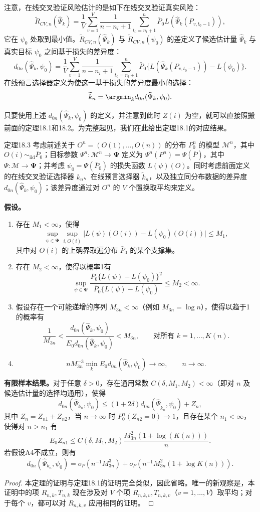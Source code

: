 注意，在线交叉验证风险估计的是如下在线交叉验证真实风险：
\[
 \widetilde R_{CV,n}(\widehat\Psi_k)
 =\frac{1}{V}\sum_{v=1}^{V}\frac{1}{n-n_l+1}
 \sum_{t_0=n_l+1}^{n}\bar P_0L(\widehat\Psi_k(P_{v,t_0-1})),
\]
它在 $\psi_0$ 处取到最小值。$\widetilde R_{CV,n}(\widehat\Psi_k)$ 与 $\widetilde R_{CV,n}(\psi_0)$ 的差定义了候选估计量 $\widehat\Psi_k$ 与真实目标 $\psi_0$ 之间基于损失的差异度：
\[
 d_{0n}(\widehat\Psi_k,\psi_0)
 =\frac{1}{V}\sum_{v=1}^{V}\frac{1}{n-n_l+1}
 \sum_{t_0=n_l+1}^{n}
 \bar P_0\{L(\widehat\Psi_k(P_{v,t_0-1}))-L(\psi_0)\}.
\]
在线预言选择器定义为使这一基于损失的差异度最小的选择：
\[
 \widetilde k_n=\argmin_k d_{0n}(\widehat\Psi_k,\psi_0).
\]

只要使用上述 $d_{0n}(\widehat\Psi_k,\psi_0)$ 的定义，并注意到此时 $Z(i)$ 为空，就可以直接照搬前面的定理18.1和18.2。为完整起见，我们在此给出定理18.1的对应结果。

\begin{bookresult}{定理}{18.3}
考虑前述关于 $O^n=(O(1),\ldots,O(n))$ 的分布 $P_0^n$ 的模型 $\mathcal M^n$，其中 $O(i)\sim_{\mathrm{iid}}\bar P_0$；目标参数 $\Psi^n:\mathcal M^n\to\bm{\Psi}$ 定义为 $\Psi^n(P^n)=\Psi(\bar P)$，其中 $\Psi:\mathcal M\to\bm{\Psi}$；并考虑 $\psi_0=\Psi(\bar P_0)$ 的损失函数 $L(\psi)(O)$。同时考虑前面定义的在线交叉验证选择器 $k_n$、在线预言选择器 $\widetilde k_n$，以及独立同分布数据的差异度 $d_{0n}(\widehat\Psi_k,\psi_0)$；该差异度通过对 $O^n$ 的 $V$ 个置换取平均来定义。

\noindent\textbf{假设。}
\begin{enumerate}[label=A\arabic*.,leftmargin=2.8em]
\item 存在 $M_1<\infty$，使得
\[
 \sup_{\psi\in\bm{\Psi}}\sup_{i,O(i)}
 \bigl|L(\psi)(O(i))-L(\psi_0)(O(i))\bigr|\le M_1,
\]
其中对 $O(i)$ 的上确界取遍分布 $\bar P_0$ 的某个支撑集。
\item 存在 $M_2<\infty$，使得以概率1有
\[
 \sup_{\psi\in\bm{\Psi}}
 \frac{\bar P_0\{L(\psi)-L(\psi_0)\}^2}
 {\bar P_0\{L(\psi)-L(\psi_0)}
 \le M_2<\infty.
\]
\item 假设存在一个可能递增的序列 $M_{3n}<\infty$（例如 $M_{3n}=\log n$），使得以趋于1的概率有
\[
 \frac{1}{M_{3n}}
 <\frac{d_{0n}(\widehat\Psi_k,\psi_0)}
 {E_0d_{0n}(\widehat\Psi_k,\psi_0)}
 <M_{3n},\qquad \text{对所有 }k=1,\ldots,K(n).
\]
\item
\[
 nM_{3n}^{-3}\min_k E_0d_{0n}(\widehat\Psi_k,\psi_0)
 \longrightarrow\infty,\qquad n\to\infty.
\]
\end{enumerate}

\noindent\textbf{有限样本结果。}对于任意 $\delta>0$，存在通用常数 $C(\delta,M_1,M_2)<\infty$（即对 $n$ 及候选估计量的选择均通用），使得
\[
 d_{0n}(\widehat\Psi_{k_n},\psi_0)
 \le(1+2\delta)d_{0n}(\widehat\Psi_{\widetilde k_n},\psi_0)+Z_n,
\]
其中 $Z_n=Z_{n1}+Z_{n2}$，当 $n\to\infty$ 时 $P_0^n(Z_{n2}=0)\to1$，且存在某个 $n_1<\infty$，使得对 $n>n_1$ 有
\[
 E_0Z_{n1}
 \le C(\delta,M_1,M_2)\frac{M_{3n}^2(1+\log(K(n)))}{n}.
\]
若假设A4不成立，则有
\[
 d_{0n}(\widehat\Psi_{k_n},\psi_0)
 =o_P(n^{-1}M_{3n}^3)+o_P(n^{-1}M_{3n}^2(1+\log K(n))).
\]
\end{bookresult}

\begin{proof}
本定理的证明与定理18.1的证明完全类似，因此省略。唯一的新观察是，本证明中的项 $R_{n,k},T_{n,k}$ 现在涉及对 $V$ 个项 $R_{n,k,v},T_{n,k,v}$（$v=1,\ldots,V$）取平均；对于每个 $v$，都可以对 $R_{n,k,v}$ 应用相同的证明。
\end{proof}
